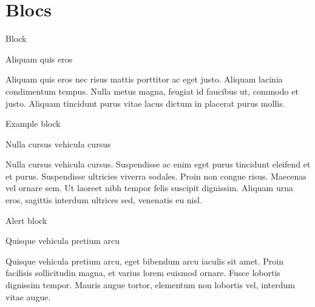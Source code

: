 \documentclass{beamer}
\begin{document}
\section{Blocs}

\begin{frame}{Block}
  \begin{block}{Aliquam quis eros}

    Aliquam quis eros nec risus mattis porttitor ac eget justo. 
    Aliquam lacinia condimentum tempus. Nulla metus magna, feugiat 
    id faucibus ut, commodo et justo. Aliquam tincidunt purus vitae 
    lacus dictum in placerat purus mollis. 

  \end{block}
\end{frame}

\begin{frame}{Example block}
  \begin{exampleblock}{Nulla cursus vehicula cursus}


    Nulla cursus vehicula cursus. Suspendisse ac enim eget purus 
    tincidunt eleifend et et purus. Suspendisse ultricies viverra 
    sodales. Proin non congue risus. Maecenas vel ornare sem. Ut 
    laoreet nibh tempor felis suscipit dignissim. Aliquam urna 
    eros, sagittis interdum ultrices sed, venenatis eu nisl.

  \end{exampleblock}
\end{frame}

\begin{frame}{Alert block}
  \begin{alertblock}{Quisque vehicula pretium arcu}

    Quisque vehicula pretium arcu, eget bibendum arcu iaculis sit amet. 
    Proin facilisis sollicitudin magna, et varius lorem euismod ornare. 
    Fusce lobortis dignissim tempor. Mauris augue tortor, elementum non 
    lobortis vel, interdum vitae augue.

  \end{alertblock}
\end{frame}
\end{document}
